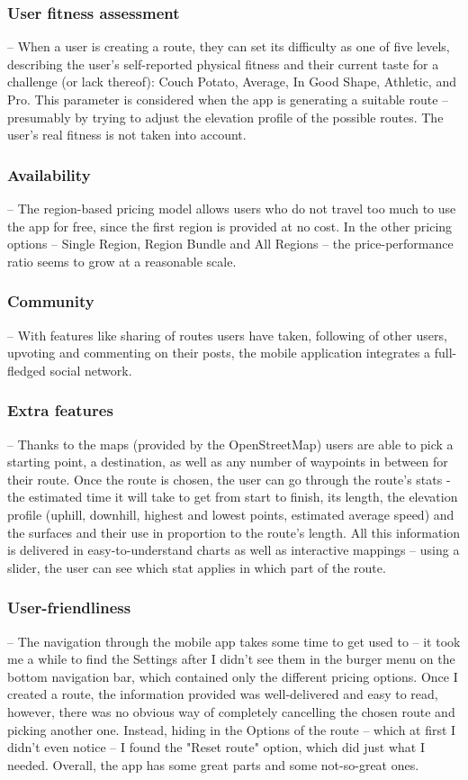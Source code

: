 \subsubsection*{User fitness assessment} -- When a user is creating a route, they can set its difficulty as one of five levels, 
describing the user's self-reported physical fitness and their current taste for a challenge (or lack thereof): Couch Potato, Average, In Good Shape, Athletic, and Pro.
This parameter is considered when the app is generating a suitable route -- presumably by trying to adjust the elevation profile of the possible routes.
The user's real fitness is not taken into account.
\subsubsection*{Availability} -- The region-based pricing model allows users who do not travel too much to use the app for free,
since the first region is provided at no cost.
In the other pricing options -- Single Region, Region Bundle and All Regions -- the price-performance ratio seems to grow at a reasonable scale.
\subsubsection*{Community} -- With features like sharing of routes users have taken, following of other users, upvoting and commenting on their posts, the mobile application integrates a full-fledged social network.
\subsubsection*{Extra features} -- Thanks to the maps (provided by the OpenStreetMap) users are able to pick a starting point, a destination, as well as any number of waypoints in between for their route.
Once the route is chosen, the user can go through the route's stats - the estimated time it will take to get from start to finish, its length, the elevation profile (uphill, downhill, highest and lowest points, estimated average speed) and the surfaces and their use in proportion to the route's length.
All this information is delivered in easy-to-understand charts as well as interactive mappings -- using a slider, the user can see which stat applies in which part of the route.
\subsubsection*{User-friendliness} -- The navigation through the mobile app takes some time to get used to -- it took me a while to find the Settings after I didn't see them in the burger menu on the bottom navigation bar, which contained only the different pricing options.
Once I created a route, the information provided was well-delivered and easy to read, however, there was no obvious way of completely cancelling the chosen route and picking another one.
Instead, hiding in the Options of the route -- which at first I didn't even notice -- I found the "Reset route" option, which did just what I needed.
Overall, the app has some great parts and some not-so-great ones.
